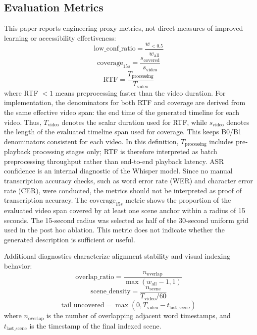 \documentclass[conference]{IEEEtran}
\begin{document}
\subsection{Evaluation Metrics}
This paper reports engineering proxy metrics, not direct measures of improved learning or accessibility effectiveness:
\begin{equation}
\text{low\_conf\_ratio} = \frac{w_{<0.5}}{w_{\text{all}}}
\end{equation}
\begin{equation}
\text{coverage}_{15s} = \frac{s_{\text{covered}}}{s_{\text{video}}}
\end{equation}
\begin{equation}
\text{RTF} = \frac{T_{\text{processing}}}{T_{\text{video}}}
\end{equation}
where RTF $< 1$ means preprocessing faster than the video duration. For implementation, the denominators for both RTF and coverage are derived from the same effective video span: the end time of the generated timeline for each video. Thus, $T_{\text{video}}$ denotes the scalar duration used for RTF, while $s_{\text{video}}$ denotes the length of the evaluated timeline span used for coverage. This keeps B0/B1 denominators consistent for each video. In this definition, $T_{\text{processing}}$ includes pre-playback processing stages only; RTF is therefore interpreted as batch preprocessing throughput rather than end-to-end playback latency. ASR confidence is an internal diagnostic of the Whisper model. Since no manual transcription accuracy checks, such as word error rate (WER) and character error rate (CER), were conducted, the metrics should not be interpreted as proof of transcription accuracy. The $\text{coverage}_{15s}$ metric shows the proportion of the evaluated video span covered by at least one scene anchor within a radius of 15 seconds. The 15-second radius was selected as half of the 30-second uniform grid used in the post hoc ablation. This metric does not indicate whether the generated description is sufficient or useful.

Additional diagnostics characterize alignment stability and visual indexing behavior:
\begin{equation}
\text{overlap\_ratio} = \frac{n_{\text{overlap}}}{\max(w_{\text{all}}-1,1)}
\end{equation}
\begin{equation}
\text{scene\_density} = \frac{n_{\text{scene}}}{T_{\text{video}}/60}
\end{equation}
\begin{equation}
\text{tail\_uncovered} = \max(0, T_{\text{video}} - t_{\text{last\_scene}})
\end{equation}
where $n_{\text{overlap}}$ is the number of overlapping adjacent word timestamps, and $t_{\text{last\_scene}}$ is the timestamp of the final indexed scene.
\end{document}
